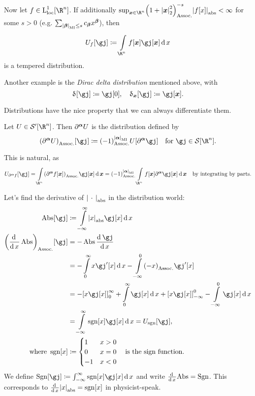 \documentclass[10pt]{article}
\newcommand{\Rn}{{\R^n}}
\newcommand{\Schwartz}{{\SchwartzSpace\of{\Rn}}}
\newcommand{\TemperedDistributions}{{\contdual\SchwartzSpace\of{\Rn}}}
\begin{document}
  Now let $f \in {\LspaceLoc[1]}\of\Rn$.
  If additionally $\sup_{\vx \in \Rn}\pa{1 + \norm{\vx}^2}^{-s}\abs{f\of{x}} < \infty$
  for some $s > 0$ (e.g. $\sum{\total\migb\leq s} c_\migb x^\migb$),
  then 
  \begin{equation*}
    U_f\of\gj \DefineAs \int\Rn f\of{\vx} \gj\of{\vx} \diffd{x}
  \end{equation*}
  is a tempered distribution.
  \begin{definition}
    Another example is the \emph{Dirac delta distribution} mentioned above, with 
    \begin{equation*}
      \DiracDelta\of\gj \DefineAs \gj\of{0},\quad \DiracDelta[\vx]\of{\gj} \DefineAs \gj\of{\vx}.
    \end{equation*}
  \end{definition}  
  
  Distributions have the nice property that we can always differentiate them.
  \begin{definition}
    Let $U\in\TemperedDistributions$. Then $\pdop\miga U$ is the distribution defined
    by 
    \begin{equation*}
      \pa{\pdop\miga U}\of{\gj} \DefineAs \pa{-1}^{\total{\miga}} U\of{\pdop\miga\gj}\quad
      \text{for }\gj \in \Schwartz.
    \end{equation*}
  \end{definition}
      This is natural, as
  \begin{align*}
    U_{\pdop\miga f}\of\gj 
    = \int\Rn\pa{\pdop\miga f\of\vx} \gj\of\vx \diffd{\vx} 
    = \pa{-1}^{\total{\miga}} \int\Rn f\of\vx \partial^\miga \gj\of\vx \diffd{\vx} 
    && \text{by integrating by parts.}
  \end{align*}

  Let's find the derivative of $\left\lvert\,\:\cdot\:\,\right\rvert_{\mathrm{abs}}$ in the distribution world:
  \begin{align*}
    \AbsDistrib\of\gj &\DefineAs \int{-\infty}[\infty] \abs{x} \gj\of{x} \diffd{x}\\
    \pa{\derivop x \AbsDistrib}\of\gj &= - \AbsDistrib  \deriv x \gj\\
    &= - \int0[\infty] x \gj\der\of{x} \diffd{x} - \int{-\infty}[0]\pa{-x}\gj\der\of{x} \\
    &= - \diff 0 \infty {x \gj\of{x}} + \int0[\infty] \gj\of{x} \diffd{x} + 
    \diff {-\infty}{0} {x \gj\of{x}} - \int{-\infty}[0] \gj\of{x} \diffd{x} \\
    &= \int{-\infty}[\infty] \Sign\of{x} \gj\of{x} \diffd{x} = U_{\Sign}\of\gj,\\
    \text{where } \Sign\of{x} &\DefineAs
	\begin{cases}
		1  & x > 0 \\
		0  & x = 0 \\
		-1 & x < 0
	\end{cases}
    \quad\text{is the sign function}.
  \end{align*}
We define $\SignDistrib\of\gj \DefineAs \int{-\infty}[\infty] \Sign\of{x} \gj\of{x} \diffd{x}$ and write $\frac{\operatorname{d}^{} {}}{{\operatorname{d} {x}}^{}} \mathrm{Abs} = \operatorname{Sgn}$. This corresponds to $\derivop x \abs{x} = \Sign\of{x}$ in physicist-speak.
\end{document}
